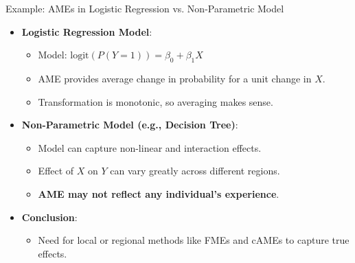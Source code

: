 \documentclass[11pt,compress,t,notes=noshow, aspectratio=169, xcolor=table]{beamer}
\begin{document}
\begin{frame}{Example: AMEs in Logistic Regression vs. Non-Parametric Model}
\begin{itemize}
\item \textbf{Logistic Regression Model}:
\begin{itemize}
\item Model: $\text{logit}(P(Y=1)) = \beta_0 + \beta_1 X$
\item AME provides average change in probability for a unit change in $X$.
\item Transformation is monotonic, so averaging makes sense.
\end{itemize}
\item \textbf{Non-Parametric Model (e.g., Decision Tree)}:
\begin{itemize}
\item Model can capture non-linear and interaction effects.
\item Effect of $X$ on $Y$ can vary greatly across different regions.
\item \textbf{AME may not reflect any individual's experience}.
\end{itemize}
\item \textbf{Conclusion}:
\begin{itemize}
\item Need for local or regional methods like FMEs and cAMEs to capture true effects.
\end{itemize}
\end{itemize}
\end{frame}
\end{document}

